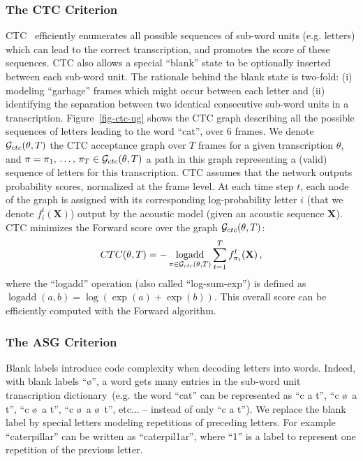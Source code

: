 \documentclass{article}
\DeclareMathOperator*{\logadd}{logadd}
\begin{document}
\subsubsection{The CTC Criterion}
\label{sec-ctccriterion}

CTC~\citep{graves2006connectionist} efficiently enumerates all possible
sequences of sub-word units (e.g. letters) which can lead to the correct
transcription, and promotes the score of these sequences. CTC also allows a
special ``blank'' state to be optionally inserted between each sub-word
unit. The rationale behind the blank state is two-fold: (i) modeling
``garbage'' frames which might occur between each letter and (ii)
identifying the separation between two identical consecutive sub-word units
in a transcription. Figure~\ref{fig-ctc-ug} shows the CTC graph describing
all the possible sequences of letters leading to the word ``cat'', over 6
frames. We denote ${\cal G}_{ctc}(\theta, T)$ the CTC acceptance graph over
$T$ frames for a given transcription $\theta$, and $\pi = {\pi_1,\,\dots,\,
  \pi_T} \in {\cal G}_{ctc}(\theta, T)$ a path in this graph representing a
(valid) sequence of letters for this transcription. CTC assumes that the
network outputs probability scores, normalized at the frame level. At each
time step $t$, each node of the graph is assigned with its corresponding
log-probability letter $i$ (that we denote $f^t_i(\mathbf{X})$) output by
the acoustic model (given an acoustic sequence $\mathbf{X}$). CTC minimizes
the Forward score over the graph ${\cal G}_{ctc}(\theta, T)$:
\begin{equation}
  \label{eq-ctc}
  CTC(\theta, T) = - \logadd_{\pi \in {\cal G}_{ctc}(\theta, T)} \sum_{t=1}^T f^t_{\pi_t}(\mathbf{X})\,,
\end{equation}
where the ``logadd'' operation (also called ``log-sum-exp'') is
defined as $\logadd(a, b) = \log(\exp(a) + \exp(b))$. This overall score
can be efficiently computed with the Forward algorithm.

\subsubsection{The ASG Criterion}
\label{sec-autosegcriterion}

Blank labels introduce code complexity when decoding letters into words. Indeed,
with blank labels ``\o'', a word gets many entries in the sub-word unit
transcription dictionary~(e.g. the word ``cat'' can be represented as ``c a
t'', ``c \o\ a t'', ``c \o\ a t'', ``c \o\ a \o\ t'', etc... -- instead of
only ``c a t''). We replace the blank label by special letters modeling
repetitions of preceding letters. For example ``caterpillar'' can be
written as ``caterpil1ar'', where ``1'' is a label to represent one
repetition of the previous letter.
\end{document}

